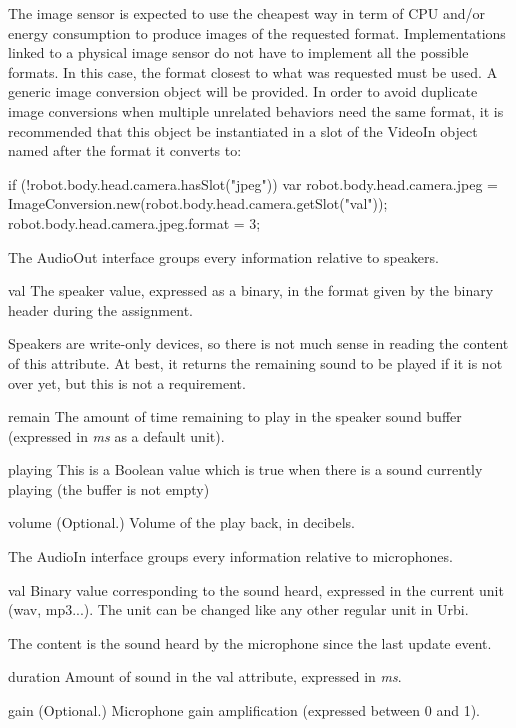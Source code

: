 The image sensor is expected to use the cheapest way in term of CPU and/or
energy consumption to produce images of the requested format.
Implementations linked to a physical image sensor do not have to implement
all the possible formats. In this case, the format closest to what was
requested must be used.  A generic image conversion object will be
provided. In order to avoid duplicate image conversions when multiple
unrelated behaviors need the same format, it is recommended that this object
be instantiated in a slot of the VideoIn object named after the format it
converts to:
\begin{urbiunchecked}
if (!robot.body.head.camera.hasSlot("jpeg"))
{
  var robot.body.head.camera.jpeg =
    ImageConversion.new(robot.body.head.camera.getSlot("val"));
  robot.body.head.camera.jpeg.format = 3;
}
\end{urbiunchecked}

The AudioOut interface groups every information relative to speakers.

\begin{urbiscriptapi}
\item[val] The speaker value, expressed as a binary, in the format given by
  the binary header during the assignment.

  Speakers are write-only devices, so there is not much sense in reading the
  content of this attribute. At best, it returns the remaining sound to be
  played if it is not over yet, but this is not a requirement.


\item[remain] The amount of time remaining to play in the speaker sound
  buffer (expressed in \textit{ms} as a default unit).


\item[playing] This is a Boolean value which is true when there is a sound
  currently playing (the buffer is not empty)%

\item[volume] (Optional.) Volume of the play back, in decibels.
\end{urbiscriptapi}




The AudioIn interface groups every information relative to microphones.

\begin{urbiscriptapi}
\item[val] Binary value corresponding to the sound heard, expressed in the
  current unit (wav, mp3...). The unit can be changed like any other regular
  unit in Urbi.

  The content is the sound heard by the microphone since the last update
  event.
\item[duration] Amount of sound in the val attribute, expressed in
  \textit{ms}.
\item[gain] (Optional.) Microphone gain amplification (expressed between 0 and 1).
\end{urbiscriptapi}


